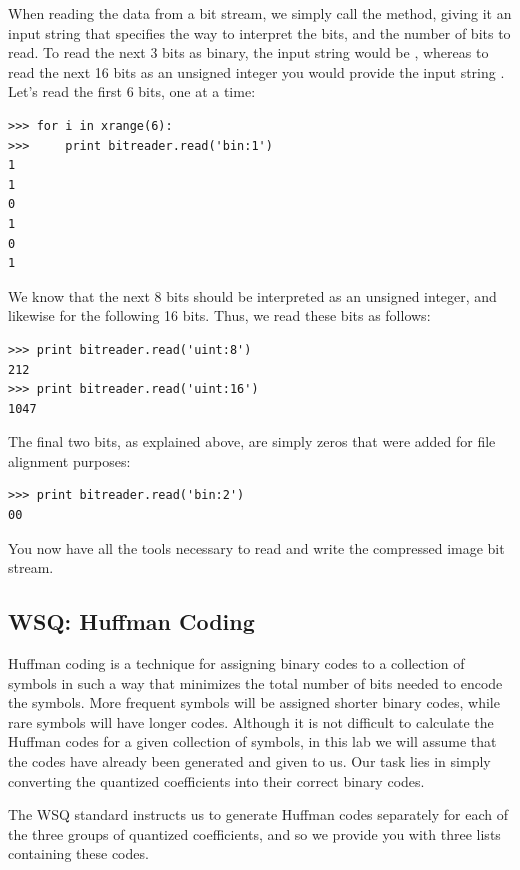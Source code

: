 When reading the data from a bit stream, we simply call the  method, giving it an input string
that specifies the way to interpret the bits, and the number of bits to read. To read the next 3 bits as
binary, the input string would be , whereas to read the next 16 bits as an unsigned integer 
you would provide the input string .
Let's read the first 6 bits, one at a time:
\begin{lstlisting}
>>> for i in xrange(6):
>>>     print bitreader.read('bin:1')
1
1
0
1
0
1
\end{lstlisting}
We know that the next 8 bits should be interpreted as an unsigned integer, and likewise for the 
following 16 bits. Thus, we read these bits as follows:
\begin{lstlisting}
>>> print bitreader.read('uint:8')
212
>>> print bitreader.read('uint:16')
1047
\end{lstlisting}
The final two bits, as explained above, are simply zeros that were added for file alignment purposes:
\begin{lstlisting}
>>> print bitreader.read('bin:2')
00
\end{lstlisting}
You now have all the tools necessary to read and write the compressed image bit stream.

\subsection*{WSQ: Huffman Coding}
Huffman coding is a technique for assigning binary codes to a collection of symbols in such a way
that minimizes the total number of bits needed to encode the symbols.
More frequent symbols will be assigned shorter binary codes, while rare symbols will have
longer codes. Although it is not difficult to calculate the Huffman codes for a given collection
of symbols, in this lab we will assume that the codes have already been generated and given to 
us. Our task lies in simply converting the quantized coefficients into their correct binary codes.

The WSQ standard instructs us to generate Huffman codes separately for each of the three groups
of quantized coefficients, and so we provide you with three lists containing these codes.

